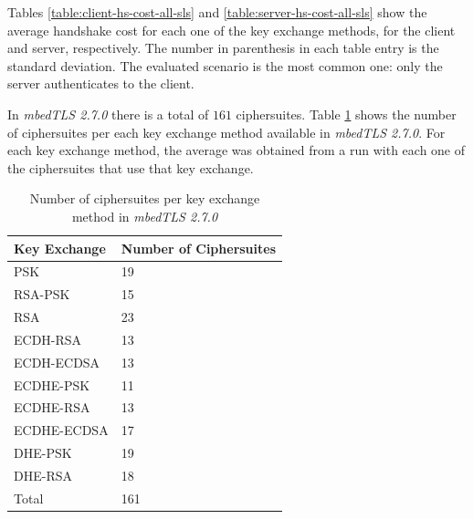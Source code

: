 Tables \ref{table:client-hs-cost-all-sls} and \ref{table:server-hs-cost-all-sls} show the average handshake cost for each one of the
key exchange methods, for the client and server, respectively. The number in parenthesis in each table entry is the standard deviation.
The evaluated scenario is the most common one: only the server authenticates to the client.

In \textit{mbedTLS 2.7.0} there is a total of $161$ ciphersuites. Table \ref{table:mbedtls-num-ciphers} shows the number of
ciphersuites per each key exchange method available in \textit{mbedTLS 2.7.0}. For each key exchange method, the average was obtained
from a run with each one of the ciphersuites that use that key exchange.

\begin{table}[]
\begin{tabular}{ll}
\hline
\multicolumn{1}{|l|}{\textbf{Key Exchange}}                     & \multicolumn{1}{l|}{\textbf{Number of Ciphersuites}} \\ \hline
\multicolumn{1}{|l|}{PSK}         & \multicolumn{1}{l|}{19}                        \\ \hline
\multicolumn{1}{|l|}{RSA-PSK}     & \multicolumn{1}{l|}{15}                        \\ \hline
\multicolumn{1}{|l|}{RSA}         & \multicolumn{1}{l|}{23}                        \\ \hline
\multicolumn{1}{|l|}{ECDH-RSA}    & \multicolumn{1}{l|}{13}                        \\ \hline
\multicolumn{1}{|l|}{ECDH-ECDSA}  & \multicolumn{1}{l|}{13}                        \\ \hline
\multicolumn{1}{|l|}{ECDHE-PSK}   & \multicolumn{1}{l|}{11}                        \\ \hline
\multicolumn{1}{|l|}{ECDHE-RSA}   & \multicolumn{1}{l|}{13}                        \\ \hline
\multicolumn{1}{|l|}{ECDHE-ECDSA} & \multicolumn{1}{l|}{17}                        \\ \hline
\multicolumn{1}{|l|}{DHE-PSK}     & \multicolumn{1}{l|}{19}                        \\ \hline
\multicolumn{1}{|l|}{DHE-RSA}     & \multicolumn{1}{l|}{18}                        \\ \hline
Total                                      & 161
\end{tabular}
\centering
\centering \caption{\label{table:mbedtls-num-ciphers} Number of ciphersuites per key exchange method in \textit{mbedTLS 2.7.0}}
\end{table}

